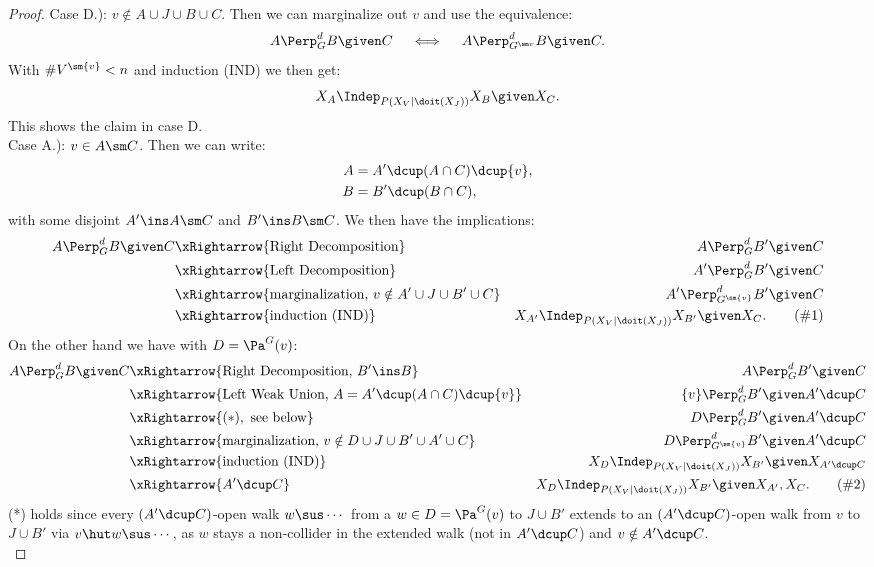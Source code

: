 \begin{Thm}
\begin{proof}
Case D.):  $v \notin A \cup J \cup B \cup C$. Then we can marginalize out $v$ and use the equivalence: 
\[A \Perp^d_{G}  B \given C\quad \iff \quad A \Perp^d_{G^{\sm v}}  B \given C.\]
With $\#V^{\sm \{v\}}<n$ and induction (IND) we then get:
\[X_A \Indep_{P(X_V|\doit(X_J))} X_B \given X_C.\]
This shows the claim in case D.\\

Case A.):  $v \in A\sm C$. Then we can write:
\begin{align*}
    A &= A' \dcup (A \cap C) \dcup \{v\}, \\
    B &= B' \dcup (B \cap C),
\end{align*}
with some disjoint $A' \ins A \sm C$ and $B' \ins B \sm C$.
We then have the implications:
\begin{align*}
    A \Perp^d_G  B \given C & \xRightarrow{\text{Right Decomposition}}  & A \Perp^d_G B' \given C \\
    & \xRightarrow{\text{Left Decomposition}}  & A' \Perp^d_G  B' \given C \\
    & \xRightarrow{\text{marginalization, } v \notin A'\cup J \cup B' \cup C}  & A' \Perp^d_{G^{\sm \{v\}}}  B' \given C \\
 & \xRightarrow{\text{induction (IND)}}  & X_{A'} \Indep_{P(X_V|\doit(X_J))}  X_{B'} \given X_C. \label{eqn:bli} \tag{\#1}\\
\end{align*}
On the other hand we have with $D = \Pa^G(v)$:
\begin{align*}
 A \Perp^d_G  B \given C & \xRightarrow{\text{Right Decomposition, }B' \ins B}  & A \Perp^d_G   B' \given C   \\
  & \xRightarrow{\text{Left Weak Union, } A= A' \dcup (A \cap C) \dcup \{v\}}  & \{v\} \Perp^d_G  B' \given A' \dcup C    \\
 & \xRightarrow{(*), \text{ see below}}  & D  \Perp^d_G   B' \given A' \dcup C \\ 
 & \xRightarrow{\text{marginalization, } v \notin D \cup J \cup B' \cup A' \cup C}  & D \Perp^d_{G^{\sm \{v\}}}  B' \given A' \dcup C \\
& \xRightarrow{\text{induction (IND)}}  &   X_D  \Indep_{P(X_V|\doit(X_J))}  X_{B'} \given X_{A' \dcup C}\\
& \xRightarrow{A'\dcup C}  &   X_D  \Indep_{P(X_V|\doit(X_J))}  X_{B'} \given X_{A'}, X_C. \label{eqn:bla} \tag{\#2}
\end{align*}
(*) holds since every $(A' \dcup C)$-open walk $ w \sus \cdots$ from a  $w \in D=\Pa^G(v)$ to $J \cup B'$ 
extends to an $(A' \dcup C)$-open walk from $v$ to $J \cup B'$ via  $v \hut w \sus \cdots$, as $w$ stays a 
non-collider in the extended walk (not in $A' \dcup C$) and $v \notin A' \dcup C$.\\


\end{proof}
\end{Thm}
